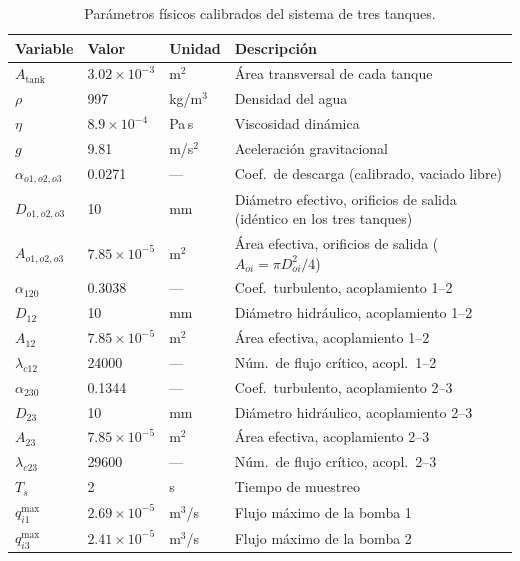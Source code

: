 \documentclass[12pt,letterpaper]{article}
\begin{document}
\begin{table}[ht]
\centering
\caption{Parámetros físicos calibrados del sistema de tres tanques.}
\label{tab:parametros}
\begin{tabular}{llll}
\toprule
\textbf{Variable} & \textbf{Valor} & \textbf{Unidad} & \textbf{Descripción} \\
\midrule
$A_{\mathrm{tank}}$ & $3.02\times10^{-3}$ & m$^2$ & Área transversal de cada tanque \\
$\rho$       & 997     & kg/m$^3$  & Densidad del agua \\
$\eta$       & $8.9\times10^{-4}$ & Pa\,s & Viscosidad dinámica \\
$g$          & 9.81    & m/s$^2$   & Aceleración gravitacional \\
$\alpha_{o1,o2,o3}$ & 0.0271 & ---  & Coef.\ de descarga (calibrado, vaciado libre) \\
$D_{o1,o2,o3}$ & 10 & mm & Diámetro efectivo, orificios de salida (idéntico en los tres tanques) \\
$A_{o1,o2,o3}$ & $7.85\times10^{-5}$ & m$^2$ & Área efectiva, orificios de salida ($A_{oi}=\pi D_{oi}^2/4$) \\
$\alpha_{120}$ & 0.3038 & ---      & Coef.\ turbulento, acoplamiento 1--2 \\
$D_{12}$     & 10      & mm        & Diámetro hidráulico, acoplamiento 1--2 \\
$A_{12}$     & $7.85\times10^{-5}$ & m$^2$ & Área efectiva, acoplamiento 1--2 \\
$\lambda_{c12}$ & 24000 & ---      & Núm.\ de flujo crítico, acopl.\ 1--2 \\
$\alpha_{230}$ & 0.1344 & ---      & Coef.\ turbulento, acoplamiento 2--3 \\
$D_{23}$     & 10      & mm        & Diámetro hidráulico, acoplamiento 2--3 \\
$A_{23}$     & $7.85\times10^{-5}$ & m$^2$ & Área efectiva, acoplamiento 2--3 \\
$\lambda_{c23}$ & 29600 & ---      & Núm.\ de flujo crítico, acopl.\ 2--3 \\
$T_s$        & 2       & s         & Tiempo de muestreo \\
$q_{i1}^{\max}$ & $2.69\times10^{-5}$ & m$^3$/s & Flujo máximo de la bomba 1 \\
$q_{i3}^{\max}$ & $2.41\times10^{-5}$ & m$^3$/s & Flujo máximo de la bomba 2 \\
\bottomrule
\end{tabular}
\end{table}
\end{document}

